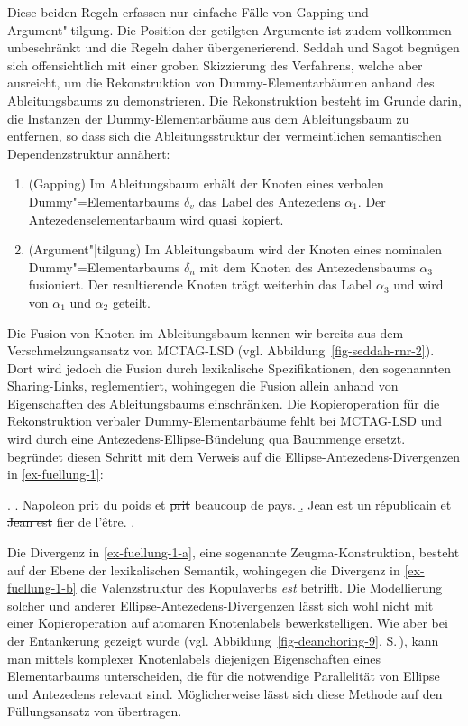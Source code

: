 Diese beiden Regeln erfassen nur einfache Fälle von Gapping und Argument"|tilgung. Die Position der getilgten Argumente ist zudem vollkommen unbeschränkt und die Regeln daher übergenerierend. Seddah und Sagot begnügen sich offensichtlich mit einer groben Skizzierung des Verfahrens, welche aber ausreicht, um die  Rekonstruktion von Dummy-Elementarbäumen anhand des Ableitungsbaums zu demonstrieren. Die Rekonstruktion besteht im Grunde darin, die Instanzen der Dummy-Elementarbäume aus dem Ableitungsbaum zu entfernen, so dass sich die Ableitungsstruktur der vermeintlichen semantischen Dependenzstruktur annähert:
\begin{enumerate}
  \item (Gapping) Im Ableitungsbaum erhält der Knoten eines verbalen Dummy"=Elementarbaums $\delta_v$ das Label des Antezedens $\alpha_1$. Der Antezedenselementarbaum wird quasi kopiert.
  \item (Argument"|tilgung) Im Ableitungsbaum wird der Knoten eines nominalen Dummy"=Elementarbaums $\delta_n$ mit dem Knoten des Antezedensbaums $\alpha_3$ fusioniert. Der resultierende Knoten trägt weiterhin das Label $\alpha_3$ und wird von $\alpha_1$ und $\alpha_2$ geteilt.
\end{enumerate}
Die Fusion von Knoten im Ableitungsbaum kennen wir bereits aus dem Verschmelzungsansatz von MCTAG-LSD (vgl. Abbildung~\ref{fig-seddah-rnr-2}). Dort wird jedoch die Fusion durch lexikalische Spezifikationen, den sogenannten Sharing-Links, reglementiert, wohingegen \cite{Seddah:Sagot:06} die Fusion allein anhand von Eigenschaften des Ableitungsbaums einschränken. Die Kopieroperation für die Rekonstruktion verbaler Dummy-Elementarbäume fehlt bei MCTAG-LSD und wird durch eine Antezedens-Ellipse-Bündelung qua Baummenge ersetzt. \cite{Seddah:08} begründet diesen Schritt mit dem Verweis auf die Ellipse-Antezedens-Divergenzen in \ref{ex-fuellung-1}: 

\ex. \label{ex-fuellung-1}
\a. Napoleon prit du poids et \sout{prit} beaucoup de pays. \label{ex-fuellung-1-a}
\b. Jean est un r\'epublicain et \sout{Jean est} fier de l'\^{e}tre. \label{ex-fuellung-1-b} 
\z. \citep[Figure~1]{Seddah:08}

Die Divergenz in \ref{ex-fuellung-1-a}, eine sogenannte Zeugma-Konstruktion, besteht auf der Ebene der lexikalischen Semantik, wohingegen die Divergenz in \ref{ex-fuellung-1-b} die Valenzstruktur des Kopulaverbs {\it est} betrifft. Die Modellierung solcher und anderer Ellipse-Antezedens-Divergenzen lässt sich wohl nicht mit einer Kopieroperation auf atomaren Knotenlabels bewerkstelligen. Wie aber bei der Entankerung gezeigt wurde (vgl. Abbildung~\ref{fig-deanchoring-9}, S.\,\pageref{fig-deanchoring-9}), kann man mittels komplexer Knotenlabels diejenigen Eigenschaften eines Elementarbaums unterscheiden, die für die notwendige Parallelität von Ellipse und Antezedens relevant sind. Möglicherweise lässt sich diese Methode auf den Füllungsansatz von \cite{Seddah:Sagot:06} übertragen.

